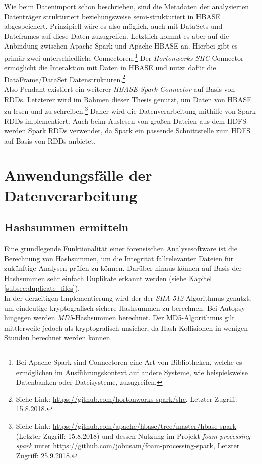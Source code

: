 \noindent
Wie beim Datenimport schon beschrieben, sind die Metadaten der analysierten Datenträger strukturiert beziehungsweise semi-strukturiert in HBASE abgespeichert. Prinzipiell wäre es also möglich, auch mit DataSets und Dateframes auf diese Daten zuzugreifen. Letztlich kommt es aber auf die Anbindung zwischen Apache Spark und Apache HBASE an. Hierbei gibt es primär zwei unterschiedliche Connectoren.\footnote{Bei Apache Spark sind Connectoren eine Art von Bibliotheken, welche es ermöglichen im Ausführungskontext auf andere Systeme, wie beispielsweise Datenbanken oder Dateisysteme, zuzugreifen.} Der \textit{Hortonworks SHC} Connector ermöglicht die Interaktion mit Daten in HBASE und nutzt dafür die DataFrame/DataSet Datenstrukturen.\footnote{Siehe Link: \url{https://github.com/hortonworks-spark/shc}. Letzter Zugriff: 15.8.2018.}\\ 
Also Pendant existiert ein weiterer \textit{HBASE-Spark Connector} auf Basis von RDDs. Letzterer wird im Rahmen dieser Thesis genutzt, um Daten von HBASE zu lesen und zu schreiben.\footnote{Siehe Link: \url{https://github.com/apache/hbase/tree/master/hbase-spark} (Letzter Zugriff: 15.8.2018) und dessen Nutzung im Projekt \textit{foam-processing-spark} unter \url{https://github.com/jobusam/foam-processing-spark}, Letzter Zugriff: 25.9.2018.}
Daher wird die Datenverarbeitung mithilfe von Spark RDDs implementiert. Auch beim Auslesen von großen Dateien aus dem HDFS werden Spark RDDs verwendet, da Spark ein passende Schnittstelle zum HDFS auf Basis von RDDs anbietet.


\section{Anwendungsfälle der Datenverarbeitung}
\subsection{Hashsummen ermitteln}
Eine grundlegende Funktionalität einer forensischen Analysesoftware ist die Berechnung von Hashsummen, um die Integrität fallrelevanter Dateien für zukünftige Analysen prüfen zu können. Darüber hinaus können auf Basis der Hashsummen sehr einfach Duplikate erkannt werden (siehe Kapitel \ref{subsec:duplicate_files}).\\
In der derzeitigen Implementierung wird der der \textit{SHA-512} Algorithmus genutzt, um eindeutige kryptografisch sichere Hashsummen zu berechnen. Bei Autopsy hingegen werden \textit{MD5}-Hashsummen berechnet. Der MD5-Algorithmus gilt mittlerweile jedoch als kryptografisch unsicher, da Hash-Kollisionen in wenigen Stunden berechnet werden können.\cite[S. 240-243]{hacking_and_security}\\

